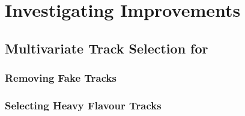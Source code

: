 \chapter{Investigating \texorpdfstring{\btagging}{b-tagging} Improvements}
\label{chap:btagging}

\section{Multivariate Track Selection for \texorpdfstring{\btagging}{b-tagging}}
\label{sec:mva track selection}

\subsection{Removing Fake Tracks}\label{sec:remove fakes mva}
\subsection{Selecting Heavy Flavour Tracks}\label{sec:keep hf mva}
